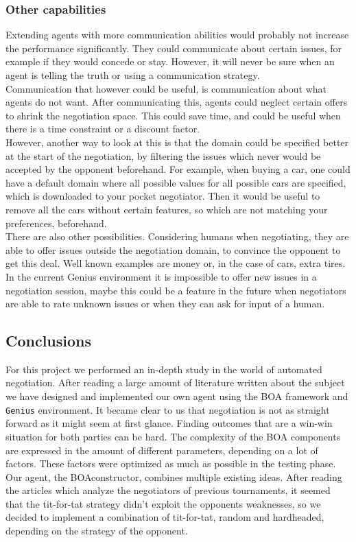 \subsubsection{Other capabilities}
Extending agents with more communication abilities would probably not increase the performance significantly. They could
communicate about certain issues, for example if they would concede or stay. However, it will never be sure when an agent is telling the truth or using a communication strategy. \\

Communication that however could be useful, is communication about what agents do not want. After communicating this, agents could neglect certain offers to shrink the negotiation space. This could save time, and could be useful when there is a time constraint or a discount factor. \\

However, another way to look at this is that the domain could be specified better at the start of the negotiation, by filtering the issues which never would be accepted by the opponent beforehand. For example, when buying a car, one could have a default domain where all possible values for all possible cars are specified, which is 
downloaded to your pocket negotiator. Then it would be useful to remove all the cars without certain features, so which are not matching your preferences, beforehand. \\

There are also other possibilities. Considering humans when negotiating, they are able to offer issues outside the negotiation domain, to convince the opponent to get this deal. Well known examples are money or, in the case of cars, extra tires. In the current Genius environment it is impossible to offer new issues in a negotiation session, maybe this could be a feature in the future when negotiators are able to rate unknown issues or when they can ask for input of a human. 

\subsection{Conclusions}

For this project we performed an in-depth study in the world of automated negotiation. After reading a large amount of literature written about the subject we have designed and implemented our own agent using the BOA framework and \texttt{Genius} environment. It became clear to us that negotiation is not as straight forward as it might seem at first glance. Finding outcomes that are a win-win situation for both parties can be hard. The complexity of the BOA components are expressed in the amount of different parameters, depending on a lot of factors. These factors were optimized as much as possible in the testing phase.  \\

Our agent, the BOAconstructor, combines multiple existing ideas. After reading the articles which analyze the negotiators of previous tournaments, it seemed that the tit-for-tat strategy didn't exploit the opponents weaknesses, so we decided to implement a combination of tit-for-tat, random and hardheaded, depending on the strategy of the opponent. 


